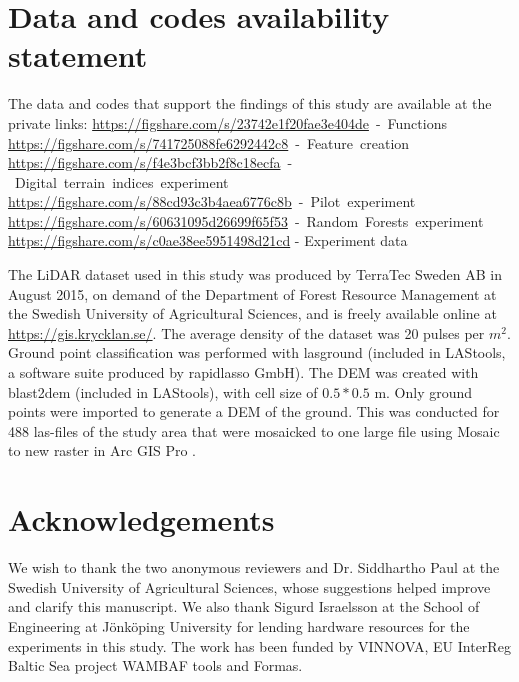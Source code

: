 \documentclass[]{interact}
\theoremstyle{plain}%
\theoremstyle{definition}
\theoremstyle{remark}
\begin{document}
\section*{Data and codes availability statement}
The data and codes that support the findings of this study are available at the private links:\newline
\mbox{\href{https://figshare.com/s/23742e1f20fae3e404de}{https://figshare.com/s/23742e1f20fae3e404de} - Functions\itshape\ignorespaces}
\mbox{\href{https://figshare.com/s/741725088fe6292442c8}{https://figshare.com/s/741725088fe6292442c8} - Feature creation\itshape\ignorespaces}
\mbox{\href{https://figshare.com/s/f4e3bcf3bb2f8c18ecfa}{https://figshare.com/s/f4e3bcf3bb2f8c18ecfa} - Digital terrain indices experiment\itshape\ignorespaces}
\mbox{\href{https://figshare.com/s/88cd93c3b4aea6776c8b}{https://figshare.com/s/88cd93c3b4aea6776c8b} - Pilot experiment\itshape\ignorespaces}
\mbox{\href{https://figshare.com/s/60631095d26699f65f53}{https://figshare.com/s/60631095d26699f65f53} - Random Forests experiment\itshape\ignorespaces}
\mbox{\href{https://figshare.com/s/c0ae38ee5951498d21cd}{https://figshare.com/s/c0ae38ee5951498d21cd}} - Experiment data

\label{lidartodem}
The LiDAR dataset used in this study was produced by TerraTec Sweden AB in August 2015, on demand of the Department of Forest Resource Management at the Swedish University of Agricultural Sciences, and is freely available online at \href{https://gis.krycklan.se/}{https://gis.krycklan.se/}. The average density of the dataset was 20 pulses per $m^2$.  Ground point classification was performed with lasground (included in LAStools, a software suite produced by rapidlasso GmbH). The DEM was created with blast2dem (included in LAStools),  with cell size of $0.5*0.5$ m. Only ground points were imported  to generate a DEM of the ground. This was conducted for 488 las-files of the study area that were mosaicked to one large file using Mosaic to new raster in Arc GIS Pro \citep{EsriArcGisBook}.

\section*{Acknowledgements}
We wish to thank the two anonymous reviewers and Dr. Siddhartho Paul at the Swedish University of Agricultural Sciences, whose suggestions helped improve and clarify this manuscript. We also thank Sigurd Israelsson at the School of Engineering at J\"onk\"oping University for lending hardware resources for the experiments in this study. The work has been funded by VINNOVA, EU InterReg Baltic Sea project WAMBAF tools and Formas.



\label{references}



\end{document}
